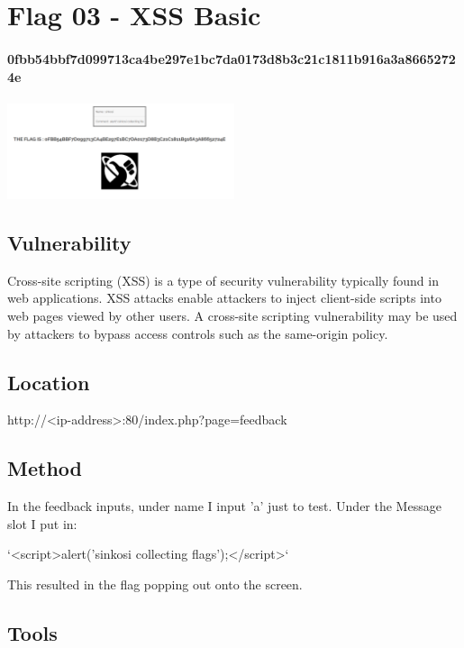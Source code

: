 \section{Flag 03 - XSS Basic}

\paragraph{0fbb54bbf7d099713ca4be297e1bc7da0173d8b3c21c1811b916a3a86652724e}
\begin{center}
    \includegraphics[width=0.5\textwidth]{06.Flag03/03-04.png}\\[0cm] 
\end{center}

\subsection{Vulnerability}

Cross-site scripting (XSS) is a type of security vulnerability typically found in web applications. XSS attacks enable attackers to inject client-side scripts into web pages viewed by other users. A cross-site scripting vulnerability may be used by attackers to bypass access controls such as the same-origin policy.

\subsection{Location}

http://<ip-address>:80/index.php?page=feedback

\subsection{Method}

In the feedback inputs, under name I input
'a' just to test. Under the Message slot I put in:

`<script>alert('sinkosi collecting flags');</script>`

This resulted in the flag popping out onto the screen.

\subsection{Tools}


